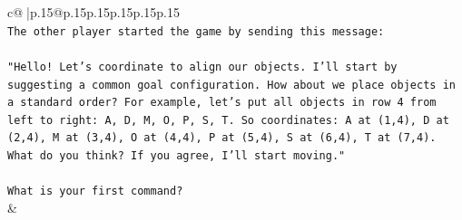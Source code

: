 \documentclass{article}
\begin{document}
{\begin{supertabular}{c@{$\;$}|p{.15\linewidth}@{}p{.15\linewidth}p{.15\linewidth}p{.15\linewidth}p{.15\linewidth}p{.15\linewidth}}
{{{\\ 
\texttt{The other player started the game by sending this message:} \\
\\ 
\texttt{"Hello! Let's coordinate to align our objects. I'll start by suggesting a common goal configuration. How about we place objects in a standard order? For example, let's put all objects in row 4 from left to right: A, D, M, O, P, S, T. So coordinates: A at (1,4), D at (2,4), M at (3,4), O at (4,4), P at (5,4), S at (6,4), T at (7,4). What do you think? If you agree, I'll start moving."} \\
\\ 
\texttt{What is your first command?} \\
            }
        }
    }
    & \\ \\


\end{supertabular}}
\end{document}
